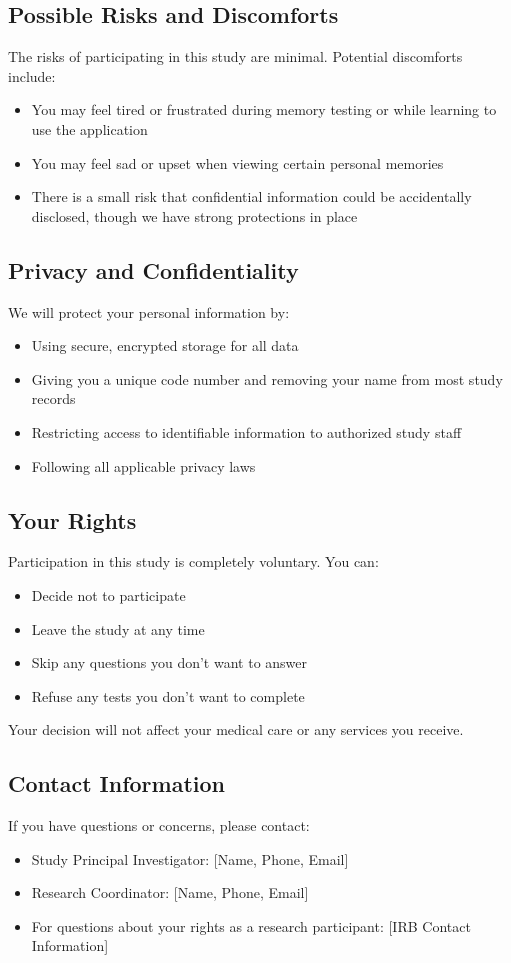 \subsection{Possible Risks and Discomforts}
The risks of participating in this study are minimal. Potential discomforts include:
\begin{itemize}
    \item You may feel tired or frustrated during memory testing or while learning to use the application
    \item You may feel sad or upset when viewing certain personal memories
    \item There is a small risk that confidential information could be accidentally disclosed, though we have strong protections in place
\end{itemize}

\subsection{Privacy and Confidentiality}
We will protect your personal information by:
\begin{itemize}
    \item Using secure, encrypted storage for all data
    \item Giving you a unique code number and removing your name from most study records
    \item Restricting access to identifiable information to authorized study staff
    \item Following all applicable privacy laws
\end{itemize}

\subsection{Your Rights}
Participation in this study is completely voluntary. You can:
\begin{itemize}
    \item Decide not to participate
    \item Leave the study at any time
    \item Skip any questions you don't want to answer
    \item Refuse any tests you don't want to complete
\end{itemize}
Your decision will not affect your medical care or any services you receive.

\subsection{Contact Information}
If you have questions or concerns, please contact:
\begin{itemize}
    \item Study Principal Investigator: [Name, Phone, Email]
    \item Research Coordinator: [Name, Phone, Email]
    \item For questions about your rights as a research participant: [IRB Contact Information]
\end{itemize}

